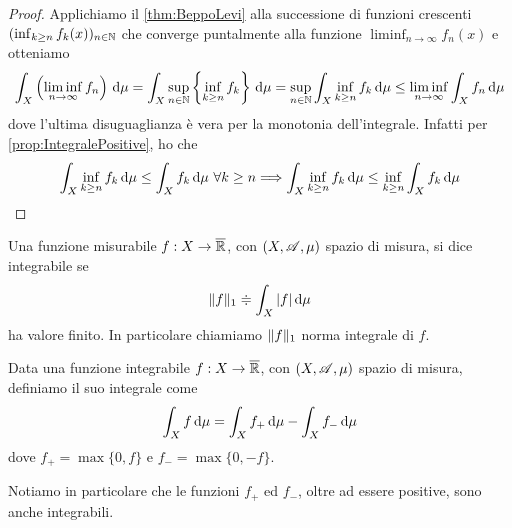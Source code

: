 \begin{proof}
	Applichiamo il \cref{thm:BeppoLevi} alla successione di funzioni crescenti $(\inf_{k\ge n}f_k(x))_{n\in\mathbb N}$ che converge puntalmente alla funzione $\liminf_{n\to\infty}f_n(x)$ e otteniamo
	\begin{equation*}
		\int_X\left(\liminf_{n\to\infty}f_n\right)\,\mathrm d\mu=\int_X \sup_{n\in\mathbb N}\left\{\inf_{k\ge n}f_k\right\}\,\mathrm d\mu=\sup_{n\in\mathbb N}\int_X \inf_{k\ge n}f_k\,\mathrm d\mu\le \liminf_{n\to\infty}\int_Xf_n\,\mathrm d\mu
	\end{equation*}
	dove l'ultima disuguaglianza è vera per la monotonia dell'integrale. Infatti per \cref{prop:IntegralePositive}, ho che
	\begin{equation*}
		\int_X \inf_{k\ge n}f_k\,\mathrm d\mu\le \int_Xf_k\,\mathrm d\mu \ \forall k\ge n \Longrightarrow \int_X \inf_{k\ge n}f_k\,\mathrm d\mu\le \inf_{k\ge n}\int_Xf_k\,\mathrm d\mu
	\end{equation*}
\end{proof}

\begin{definition}
	Una funzione misurabile $f:X\to\overline{\mathbb R}$, con $(X,\mathscr A,\mu)$ spazio di misura, si dice integrabile se 
	\begin{equation*}
		\Vert f\Vert_1\doteqdot \int_X |f|\,\mathrm d\mu
	\end{equation*}
	ha valore finito. In particolare chiamiamo $\Vert f\Vert_1$ norma integrale di $f$.
	
\end{definition}

\begin{definition}\label{def:IntegraleIntegrabili}
	Data una funzione integrabile $f:X\to\overline{\mathbb R}$, con $(X,\mathscr A,\mu)$ spazio di misura, definiamo il suo integrale come
	\begin{equation*}
		\int_X f\,\mathrm d\mu=\int_Xf_+\,\mathrm d\mu-\int_Xf_-\,\mathrm d\mu
	\end{equation*}
	dove $f_+=\max\{0,f\}$ e $f_-=\max\{0,-f\}$.
\end{definition}

\begin{remark}
	Notiamo in particolare che le funzioni $f_+$ ed $f_-$, oltre ad essere positive, sono anche integrabili.
\end{remark}


